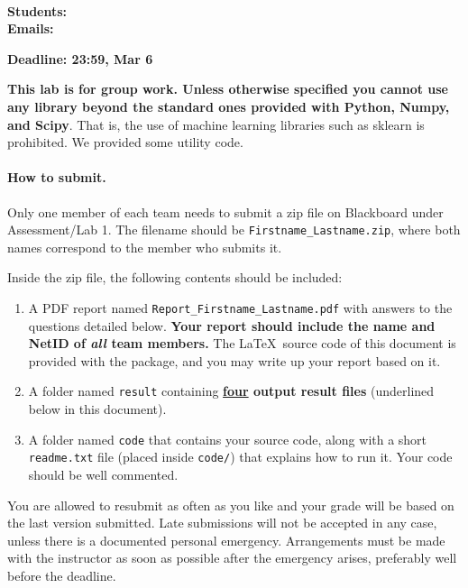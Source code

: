 \documentclass[11pt]{report}
\begin{document}
\maketitle \\
\textcolor{b}{\textbf{Students:} } \\
\textcolor{b}{\textbf{Emails:} }

{\bf Deadline: 23:59, Mar 6}

{\bf This lab is for group work.
Unless otherwise specified you cannot use any library beyond the standard ones provided with Python, Numpy, and Scipy}.
That is, the use of machine learning libraries such as sklearn is prohibited.
We provided some utility code.



\paragraph{How to submit.}

Only one member of each team needs to submit a zip file on Blackboard under Assessment/Lab 1.
The filename should be \verb#Firstname_Lastname.zip#,
where both names correspond to the member who submits it.


Inside the zip file, the following contents should be included:
\begin{enumerate}
	\item  A PDF report named \verb#Report_Firstname_Lastname.pdf# with answers to the questions detailed below.
	{\bf Your report should include the name and NetID of \emph{all} team members.}
	The \LaTeX\ source code of this document is provided with the package, and you may write up your report based on it.
	\item A folder named \verb#result# containing {\bf \underline{four} output result files} (underlined below in this document).
	\item A folder named \verb#code# that contains your source code, along with a short \verb#readme.txt# file (placed inside \verb#code/#) that explains how to run it.
		Your code should be well commented.
\end{enumerate}



You are allowed to resubmit as often as you like and your grade will be based on the last version submitted.
Late submissions will not be accepted in any case, 
unless there is a documented personal emergency.  
Arrangements must be made with the instructor as soon as possible after the emergency arises,
preferably well before the deadline.
\end{document}
